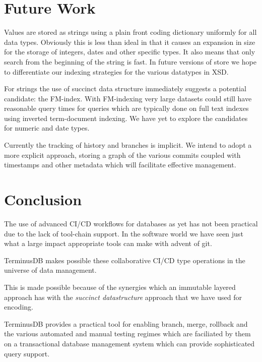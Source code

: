 \documentclass[10pt, a4paper, twocolumn]{article} %
\begin{document}
\section{Future Work}

Values are stored as strings using a plain front coding dictionary
uniformly for all data types. Obviously this is less than ideal in
that it causes an expansion in size for the storage of integers, dates
and other specific types. It also means that only search from the
beginning of the string is fast. In future versions of store we hope
to differentiate our indexing strategies for the various datatypes in
XSD.

For strings the use of succinct data structure immediately suggests a
potential candidate: the
FM-index\cite{Ferragina:2005:ICT:1082036.1082039}. With FM-indexing
very large datasets could still have reasonable query times for
queries which are typically done on full text indexes using inverted
term-document indexing. We have yet to explore the candidates for
numeric and date types.

Currently the tracking of history and branches is implicit. We intend
to adopt a more explicit approach, storing a graph of the various
commits coupled with timestamps and other metadata which will
facilitate effective management.

\section{Conclusion}

The use of advanced CI/CD workflows for databases as yet has not been
practical due to the lack of tool-chain support. In the software world
we have seen just what a large impact appropriate tools can make with
advent of git.

TerminusDB makes possible these collaborative CI/CD type operations in
the universe of data management.

This is made possible because of the synergies which an immutable
layered approach has with the {\em succinct datastructure} approach
that we have used for encoding.

TerminusDB provides a practical tool for enabling branch, merge,
rollback and the various automated and manual testing regimes which
are faciliated by them on a transactional database management system
which can provide sophisticated query support.

\printbibliography[title={Bibliography}]
\end{document}

